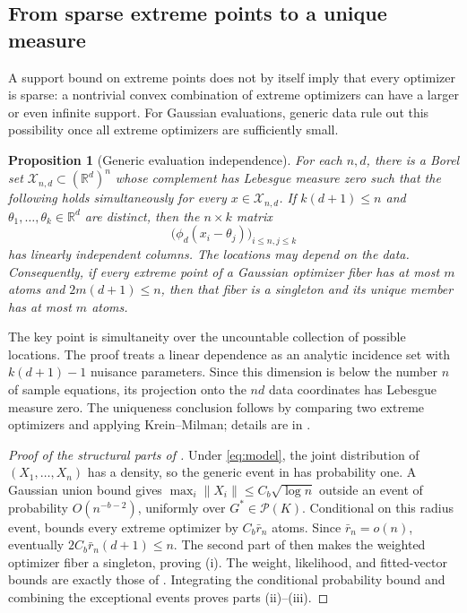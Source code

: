 \documentclass[11pt]{article}
\newtheorem{proposition}[proposition]{Proposition}
\theoremstyle{definition}
\theoremstyle{remark}
\newcommand{\Pcal}{\mathcal P}
\newcommand{\RR}{\mathbb R}
\newcommand{\norm}[1]{\lVert #1\rVert}
\begin{document}
\subsection{From sparse extreme points to a unique measure}

A support bound on extreme points does not by itself imply that every
optimizer is sparse: a nontrivial convex combination of extreme optimizers
can have a larger or even infinite support.  For Gaussian evaluations,
generic data rule out this possibility once all extreme optimizers are
sufficiently small.

\begin{proposition}[Generic evaluation independence]
\label{prop:generic}
For each $n,d$, there is a Borel set $\mathcal X_{n,d}\subset(\RR^d)^n$ whose
complement has Lebesgue measure zero such that the following holds
simultaneously for every $x\in\mathcal X_{n,d}$.  If
$k(d+1)\le n$ and $\theta_1,\ldots,\theta_k\in\RR^d$ are distinct, then the
$n\times k$ matrix
\begin{equation}\label{eq:evaluation-matrix}
 \bigl(\phi_d(x_i-\theta_j)\bigr)_{i\le n,j\le k}
\end{equation}
has linearly independent columns.  The locations may depend on the data.
Consequently, if every extreme point of a Gaussian optimizer fiber has at
most $m$ atoms and $2m(d+1)\le n$, then that fiber is a singleton and its
unique member has at most $m$ atoms.
\end{proposition}

The key point is simultaneity over the uncountable collection of possible
locations.  The proof treats a linear dependence as an analytic incidence
set with $k(d+1)-1$ nuisance parameters.  Since this dimension is below the
number $n$ of sample equations, its projection onto the $nd$ data coordinates
has Lebesgue measure zero.  The uniqueness conclusion follows by comparing
two extreme optimizers and applying Krein--Milman; details are in
.

\begin{proof}[Proof of the structural parts of ]
Under \eqref{eq:model}, the joint distribution of
$(X_1,\ldots,X_n)$ has a density, so the generic event in
 has probability one.  A Gaussian union bound gives
$\max_i\norm{X_i}\le C_b\sqrt{\log n}$ outside an event of probability
$O(n^{-b-2})$, uniformly over $G^*\in\Pcal(K)$.  Conditional on this radius
event,  bounds every extreme optimizer by
$C_b\bar r_n$ atoms.  Since $\bar r_n=o(n)$, eventually
$2C_b\bar r_n(d+1)\le n$.  The second part of  then makes
the weighted optimizer fiber a singleton, proving (i).
The weight, likelihood, and fitted-vector bounds are exactly those of
.  Integrating the conditional probability bound and
combining the exceptional events proves parts (ii)--(iii).
\end{proof}
\end{document}
